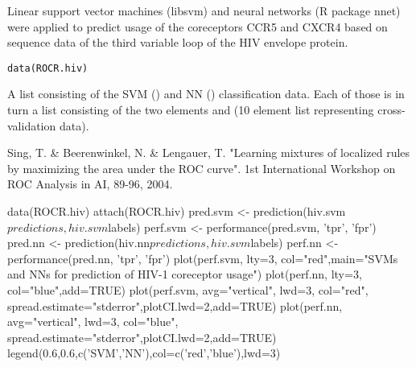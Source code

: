 \begin{Description}\relax
Linear support vector machines (libsvm) and neural networks (R package
nnet) were applied to predict usage of the coreceptors CCR5 and CXCR4
based on sequence data of the third variable loop of the HIV envelope
protein.
\end{Description}
\begin{Usage}
\begin{verbatim}data(ROCR.hiv)\end{verbatim}
\end{Usage}
\begin{Format}\relax
A list consisting of the SVM () and NN
() classification data. Each of those is in turn a list
consisting of the two elements  and 
(10 element list representing cross-validation data).
\end{Format}
\begin{References}\relax
Sing, T. \& Beerenwinkel, N. \& Lengauer, T.  "Learning mixtures
of localized rules by maximizing the area under the ROC curve".  1st
International Workshop on ROC Analysis in AI, 89-96, 2004.
\end{References}
\begin{Examples}
\begin{ExampleCode}
data(ROCR.hiv)
attach(ROCR.hiv)
pred.svm <- prediction(hiv.svm$predictions, hiv.svm$labels)
perf.svm <- performance(pred.svm, 'tpr', 'fpr')
pred.nn <- prediction(hiv.nn$predictions, hiv.svm$labels)
perf.nn <- performance(pred.nn, 'tpr', 'fpr')
plot(perf.svm, lty=3, col="red",main="SVMs and NNs for prediction of
HIV-1 coreceptor usage")
plot(perf.nn, lty=3, col="blue",add=TRUE)
plot(perf.svm, avg="vertical", lwd=3, col="red",
     spread.estimate="stderror",plotCI.lwd=2,add=TRUE)
plot(perf.nn, avg="vertical", lwd=3, col="blue",
spread.estimate="stderror",plotCI.lwd=2,add=TRUE)
legend(0.6,0.6,c('SVM','NN'),col=c('red','blue'),lwd=3)
\end{ExampleCode}
\end{Examples}

